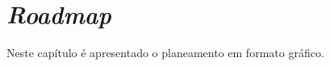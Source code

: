 \chapter{\textit{Roadmap}} 
\label{anexo1}

Neste capítulo é apresentado o planeamento em formato gráfico.


